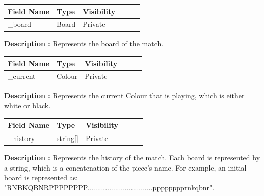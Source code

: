 \documentclass[12pt]{article}
\begin{document}
\begin{table}[H]
    \begin{tabular}{llllll}
    \hline
    \multicolumn{1}{|l|}{\cellcolor[HTML]{EFEFEF}\textbf{Field Name}} & \multicolumn{1}{l|}{\cellcolor[HTML]{EFEFEF}\textbf{Type}} & \multicolumn{1}{l|}{\cellcolor[HTML]{EFEFEF}\textbf{Visibility}} \\ \hline
    \multicolumn{1}{|l|}{\_board}                                     & \multicolumn{1}{l|}{Board}                                 & \multicolumn{1}{l|}{Private}                                     \\ \hline
    \end{tabular}
\end{table}

\textbf{Description :}  Represents the board of the match. 

\begin{table}[H]
    \begin{tabular}{llllll}
    \hline
    \multicolumn{1}{|l|}{\cellcolor[HTML]{EFEFEF}\textbf{Field Name}} & \multicolumn{1}{l|}{\cellcolor[HTML]{EFEFEF}\textbf{Type}} & \multicolumn{1}{l|}{\cellcolor[HTML]{EFEFEF}\textbf{Visibility}} \\ \hline
    \multicolumn{1}{|l|}{\_current}                                     & \multicolumn{1}{l|}{Colour}                                 & \multicolumn{1}{l|}{Private}                                     \\ \hline
    \end{tabular}
\end{table}

\textbf{Description :} Represents the current Colour that is playing, which is either white or black. 

\begin{table}[H]
    \begin{tabular}{llllll}
    \hline
    \multicolumn{1}{|l|}{\cellcolor[HTML]{EFEFEF}\textbf{Field Name}} & \multicolumn{1}{l|}{\cellcolor[HTML]{EFEFEF}\textbf{Type}} & \multicolumn{1}{l|}{\cellcolor[HTML]{EFEFEF}\textbf{Visibility}} \\ \hline
    \multicolumn{1}{|l|}{\_history}                                     & \multicolumn{1}{l|}{string[]}                            & \multicolumn{1}{l|}{Private}                                     \\ \hline
    \end{tabular}
\end{table}

\textbf{Description :} Represents the history of the match.
Each board is represented by a string, which is a concatenation of the piece's name.
For example, an initial board is represented as:
\\"RNBKQBNRPPPPPPPP.................................pppppppprnkqbnr". 
\end{document}
